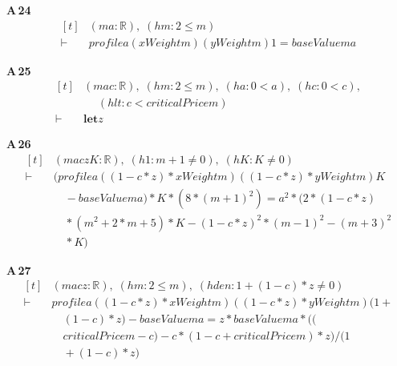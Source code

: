 \noindent\textbf{A\,24}\quad{}
{\footnotesize\[ \begin{aligned}[t]
&(\mathit{m} \mathit{a} : \mathbb{R} ),\; (\mathit{hm} : 2 \leq \mathit{m})\\
\vdash\;&\mathit{profile} \mathit{a} (\mathit{xWeight} \mathit{m}) (\mathit{yWeight} \mathit{m}) 1 = \mathit{baseValue} \mathit{m} \mathit{a}
\end{aligned} \]}

\noindent\textbf{A\,25}\quad{}
{\footnotesize\[ \begin{aligned}[t]
&(\mathit{m} \mathit{a} \mathit{c} : \mathbb{R} ),\; (\mathit{hm} : 2 \leq \mathit{m}),\; (\mathit{ha} : 0 < \mathit{a}),\; (\mathit{hc} : 0 < \mathit{c}),\\
&\quad \; (\mathit{hlt} : \mathit{c} < \mathit{criticalPrice} \mathit{m})\\
\vdash\;&\mathbf{let} \mathit{z}
\end{aligned} \]}

\noindent\textbf{A\,26}\quad{}
{\footnotesize\[ \begin{aligned}[t]
&(\mathit{m} \mathit{a} \mathit{c} \mathit{z} \mathit{K} : \mathbb{R} ),\; (\mathit{h1} : \mathit{m}+1 \neq 0),\; (\mathit{hK} : \mathit{K} \neq 0)\\
\vdash\;&(\mathit{profile} \mathit{a} ((1-\mathit{c}*\mathit{z})*\mathit{xWeight} \mathit{m}) ((1-\mathit{c}*\mathit{z})*\mathit{yWeight} \mathit{m}) \mathit{K}\\
&\quad - \mathit{baseValue} \mathit{m} \mathit{a}) * \mathit{K} * (8*(\mathit{m}+1)^{2}) = \mathit{a}^{2} * (2*(1-\mathit{c}*\mathit{z})\\
&\quad *(\mathit{m}^{2}+2*\mathit{m}+5)*\mathit{K} - (1-\mathit{c}*\mathit{z})^{2}*(\mathit{m}-1)^{2} - (\mathit{m}+3)^{2}\\
&\quad *\mathit{K})
\end{aligned} \]}

\noindent\textbf{A\,27}\quad{}
{\footnotesize\[ \begin{aligned}[t]
&(\mathit{m} \mathit{a} \mathit{c} \mathit{z} : \mathbb{R} ),\; (\mathit{hm} : 2 \leq \mathit{m}),\; (\mathit{hden} : 1+(1-\mathit{c})*\mathit{z} \neq 0)\\
\vdash\;&\mathit{profile} \mathit{a} ((1-\mathit{c}*\mathit{z})*\mathit{xWeight} \mathit{m}) ((1-\mathit{c}*\mathit{z})*\mathit{yWeight} \mathit{m}) (1+\\
&\quad (1-\mathit{c})*\mathit{z}) - \mathit{baseValue} \mathit{m} \mathit{a} = \mathit{z}*\mathit{baseValue} \mathit{m} \mathit{a}*((\\
&\quad \mathit{criticalPrice} \mathit{m}-\mathit{c})-\mathit{c}*(1-\mathit{c}+\mathit{criticalPrice} \mathit{m})*\mathit{z})/(1\\
&\quad +(1-\mathit{c})*\mathit{z})
\end{aligned} \]}

